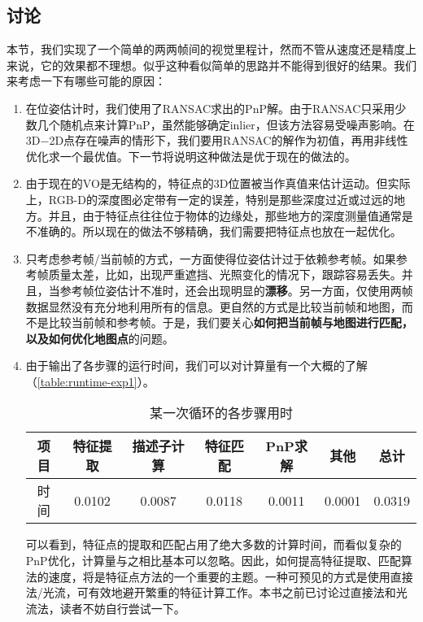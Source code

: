 \subsection{讨论}
本节，我们实现了一个简单的两两帧间的视觉里程计，然而不管从速度还是精度上来说，它的效果都不理想。似乎这种看似简单的思路并不能得到很好的结果。我们来考虑一下有哪些可能的原因：

\begin{enumerate}
	\item
	在位姿估计时，我们使用了RANSAC求出的PnP解。由于RANSAC只采用少数几个随机点来计算PnP，虽然能够确定inlier，但该方法容易受噪声影响。在3D−2D点存在噪声的情形下，我们要用RANSAC的解作为初值，再用非线性优化求一个最优值。下一节将说明这种做法是优于现在的做法的。
	
	\item 
	由于现在的VO是无结构的，特征点的3D位置被当作真值来估计运动。但实际上，RGB-D的深度图必定带有一定的误差，特别是那些深度过近或过远的地方。并且，由于特征点往往位于物体的边缘处，那些地方的深度测量值通常是不准确的。所以现在的做法不够精确，我们需要把特征点也放在一起优化。
	
	\item 只考虑参考帧/当前帧的方式，一方面使得位姿估计过于依赖参考帧。如果参考帧质量太差，比如，出现严重遮挡、光照变化的情况下，跟踪容易丢失。并且，当参考帧位姿估计不准时，还会出现明显的\textbf{漂移}。另一方面，仅使用两帧数据显然没有充分地利用所有的信息。更自然的方式是比较当前帧和地图，而不是比较当前帧和参考帧。于是，我们要关心\textbf{如何把当前帧与地图进行匹配，以及如何优化地图点}的问题。
	
	\item 由于输出了各步骤的运行时间，我们可以对计算量有一个大概的了解（\autoref{table:runtime-exp1}）。
	
	\begin{table}[!ht]
		\centering
		\caption{某一次循环的各步骤用时}
		\label{table:runtime-exp1}
			\begin{tabu}{c|c|c|c|c|c|c}
				\toprule
				项目 & 特征提取 & 描述子计算 & 特征匹配 & PnP求解 & 其他 & 总计 \\ \midrule
				时间 & 0.0102 & 0.0087 & 0.0118 & 0.0011 & 0.0001 & 0.0319 \\ 
				\bottomrule
			\end{tabu} 
	\end{table}
	
	可以看到，特征点的提取和匹配占用了绝大多数的计算时间，而看似复杂的PnP优化，计算量与之相比基本可以忽略。因此，如何提高特征提取、匹配算法的速度，将是特征点方法的一个重要的主题。一种可预见的方式是使用直接法/光流，可有效地避开繁重的特征计算工作。本书之前已讨论过直接法和光流法，读者不妨自行尝试一下。
\end{enumerate}

